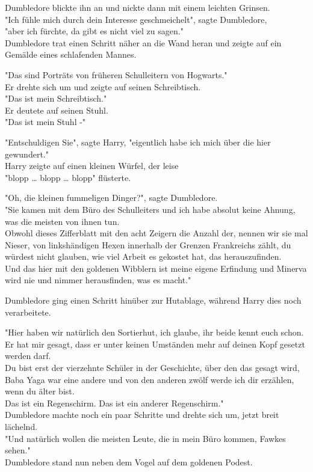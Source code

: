 {Dumbledore blickte ihn an und nickte dann mit einem leichten Grinsen.\\ "Ich fühle mich durch dein Interesse geschmeichelt", sagte Dumbledore,\\ "aber ich fürchte, da gibt es nicht viel zu sagen."\\ Dumbledore trat einen Schritt näher an die Wand heran und zeigte auf ein Gemälde eines schlafenden Mannes.

"Das sind Porträts von früheren Schulleitern von Hogwarts."\\ Er drehte sich um und zeigte auf seinen Schreibtisch.\\ "Das ist mein Schreibtisch."\\ Er deutete auf seinen Stuhl.\\ "Das ist mein Stuhl -"

"Entschuldigen Sie", sagte Harry, "eigentlich habe ich mich über die hier gewundert."\\ Harry zeigte auf einen kleinen Würfel, der leise\\ "blopp … blopp … blopp" flüsterte.

"Oh, die kleinen fummeligen Dinger?", sagte Dumbledore.\\ "Sie kamen mit dem Büro des Schulleiters und ich habe absolut keine Ahnung, was die meisten von ihnen tun.\\ Obwohl dieses Zifferblatt mit den acht Zeigern die Anzahl der, nennen wir sie mal Nieser, von linkshändigen Hexen innerhalb der Grenzen Frankreichs zählt, du würdest nicht glauben, wie viel Arbeit es gekostet hat, das herauszufinden.\\ Und das hier mit den goldenen Wibblern ist meine eigene Erfindung und Minerva wird nie und nimmer herausfinden, was es macht."

Dumbledore ging einen Schritt hinüber zur Hutablage, während Harry dies noch verarbeitete.

"Hier haben wir natürlich den Sortierhut, ich glaube, ihr beide kennt euch schon. Er hat mir gesagt, dass er unter keinen Umständen mehr auf deinen Kopf gesetzt werden darf.\\ Du bist erst der vierzehnte Schüler in der Geschichte, über den das gesagt wird, Baba Yaga war eine andere und von den anderen zwölf werde ich dir erzählen, wenn du älter bist.\\ Das ist ein Regenschirm. Das ist ein anderer Regenschirm."\\ Dumbledore machte noch ein paar Schritte und drehte sich um, jetzt breit lächelnd.\\ "Und natürlich wollen die meisten Leute, die in mein Büro kommen, Fawkes sehen."\\ Dumbledore stand nun neben dem Vogel auf dem goldenen Podest.

}
